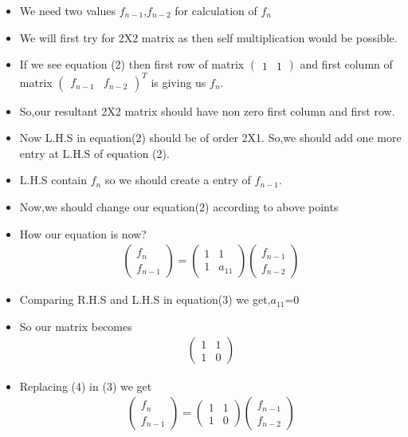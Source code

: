 \documentclass[journal,12pt,twocolumn]{IEEEtran}
\begin{document}
\begin{itemize}
    \item We need two values $f_{n-1}$,$f_{n-2}$ for calculation of $f_n$
    \item We will first try for 2X2 matrix as then self multiplication would be possible.
    \item If we see equation (2) then first row of matrix $\begin{pmatrix}1 & 1\end{pmatrix}$ and first column of matrix $\begin{pmatrix} f_{n-1} & f_{n-2}\end{pmatrix}^T$ is giving us $f_n$.
    \item So,our resultant 2X2 matrix should have non zero first column and first row.
    \item Now L.H.S in equation(2) should be of order 2X1.
    So,we should add one more entry at L.H.S of equation (2).\\
    \item L.H.S contain $f_n$ so we should create a entry of $f_{n-1}$.
    \item Now,we should change our equation(2)  according to above points
    \item How our equation is now?
    \begin{align}
      \begin{pmatrix}f_n\\f_{n-1}\end{pmatrix}=\begin{pmatrix}1 & 1\\1 & a_{11}\end{pmatrix}\begin{pmatrix}f_{n-1}\\f_{n-2}\end{pmatrix}
    \end{align}
    \item Comparing R.H.S and L.H.S in equation(3) we get,$a_{11}$=0
    \item  So our matrix becomes\\
    \begin{align}
    \begin{pmatrix}1 & 1\\1 & 0\end{pmatrix}
    \end{align}
    \item Replacing (4) in (3) we get
    \begin{align}
      \boxed{\begin{pmatrix}f_n\\f_{n-1}\end{pmatrix}=\begin{pmatrix}1 & 1\\1 & 0\end{pmatrix}\begin{pmatrix}f_{n-1}\\f_{n-2}\end{pmatrix}}
    \end{align}
    
\end{itemize}
\end{document}
